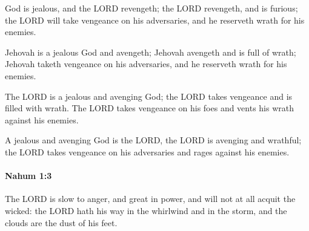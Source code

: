 			God is jealous, and the LORD revengeth; the LORD revengeth, and is furious; the LORD will take vengeance on his adversaries, and he reserveth wrath for his enemies.

			\begin{versebox}
					\item[BHS] 
					\item[LXX] 
					\item[ASV] Jehovah is a jealous God and avengeth; Jehovah avengeth and is full of wrath; Jehovah taketh vengeance on his adversaries, and he reserveth wrath for his enemies.
					\item[NIV] The LORD is a jealous and avenging God; the LORD takes vengeance and is filled with wrath. The LORD takes vengeance on his foes and vents his wrath against his enemies.
					\item[NRSV] A jealous and avenging God is the LORD, the LORD is avenging and wrathful; the LORD takes vengeance on his adversaries and rages against his enemies.
			\end{versebox}

		\paragraph{Nahum 1:3} %
			\label{NAHUM-1-3}

			The LORD is slow to anger, and great in power, and will not at all acquit the wicked: the LORD hath his way in the whirlwind and in the storm, and the clouds are the dust of his feet.

